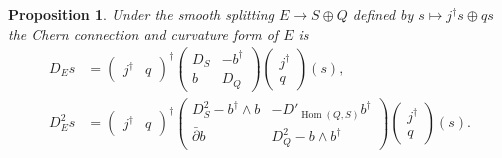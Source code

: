 \documentclass[10pt,a4paper]{article}
\newtheorem{prop}[theo]{Proposition}
\DeclareMathOperator{\Hom}{Hom}
\begin{document}
\begin{prop}
Under the smooth splitting $E \to S \oplus Q$ defined by $s \mapsto j^\dagger s \oplus qs$ the Chern connection and curvature form of $E$ is
\begin{align*}
D_E s &=
\begin{pmatrix}
j^\dagger & q
\end{pmatrix}^\dagger
\begin{pmatrix}
D_S & - b^\dagger
\\
b & D_Q
\end{pmatrix}
\begin{pmatrix}
j^\dagger \\ q
\end{pmatrix}
(s),
\\
D_E^2 s &=
\begin{pmatrix}
j^\dagger & q
\end{pmatrix}^\dagger
\begin{pmatrix}
D^2_S - b^\dagger \wedge b & -D'_{\Hom(Q,S)} b^\dagger
\\
\bar\partial b & D^2_Q - b \wedge b^\dagger
\end{pmatrix}
\begin{pmatrix}
  j^\dagger \\ q
\end{pmatrix}(s).
\end{align*}
\end{prop}
\end{document}
